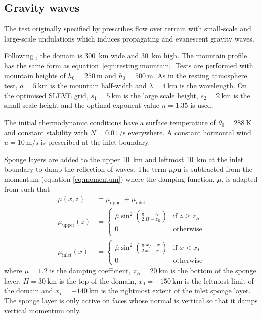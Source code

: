 \documentclass[twocol]{ametsoc}
\begin{document}
\subsection{Gravity waves}
The test originally specified by \citet{schaer2002} prescribes flow over terrain with small-scale and large-scale undulations which induces propagating and evanescent gravity waves.

Following \citet{melvin2010}, the domain is \SI{300}{\kilo\meter} wide and \SI{30}{\kilo\meter} high.  The mountain profile has the same form as equation~\ref{eqn:resting:mountain}.  Tests are performed with mountain heights of $h_0 = \SI{250}{\meter}$ and \(h_0 = \SI{500}{\meter}\).  As in the resting atmosphere test, $a = \SI{5}{\kilo\meter}$ is the mountain half-width and $\lambda = \SI{4}{\kilo\meter}$ is the wavelength.  On the optimised SLEVE grid, $s_1 = \SI{5}{\kilo\meter}$ is the large scale height, $s_2 = \SI{2}{\kilo\meter}$ is the small scale height and the optimal exponent value $n = 1.35$ is used.

The initial thermodynamic conditions have a surface temperature of $\theta_0 = \SI{288}{\kelvin}$ and constant stability with $N = \SI{0.01}{\per\second}$ everywhere.  A constant horizontal wind $u = \SI{10}{\meter\per\second}$ is prescribed at the inlet boundary.

Sponge layers are added to the upper \SI{10}{\kilo\meter} and leftmost \SI{10}{\kilo\meter} at the inlet boundary to damp the reflection of waves.
The term $\mu \rho \bm{u}$ is subtracted from the momentum (equation \ref{eq:momentum}) where the damping function, \(\mu\), is adapted from \citet{melvin2010} such that
\begin{align}
	\mu(x, z) &= \mu_\mathrm{upper} + \mu_\mathrm{inlet} \\
	\mu_\mathrm{upper}(z) &= \begin{cases}
		\overline{\mu} \sin^2 \left( \frac{\pi}{2} \frac{z - z_B}{H - z_B} \right) & \text{if } z \geq z_B \\
		0 & \text{otherwise} \\
	\end{cases} \\
	\mu_\mathrm{inlet}(x) &= \begin{cases}
		\overline{\mu} \sin^2 \left( \frac{\pi}{2} \frac{x_I - x}{x_I - x_0} \right) & \text{if } x < x_I \\
		0 & \text{otherwise}
	\end{cases}
\end{align}
where $\overline{\mu} = 1.2$ is the damping coefficient, $z_B = \SI{20}{\kilo\meter}$ is the bottom of the sponge layer, $H = \SI{30}{\kilo\meter}$ is the top of the domain, $x_0 = \SI{-150}{\kilo\meter}$ is the leftmost limit of the domain and $x_I = \SI{-140}{\kilo\meter}$ is the rightmost extent of the inlet sponge layer.  The sponge layer is only active on faces whose normal is vertical so that it damps vertical momentum only.
\end{document}
